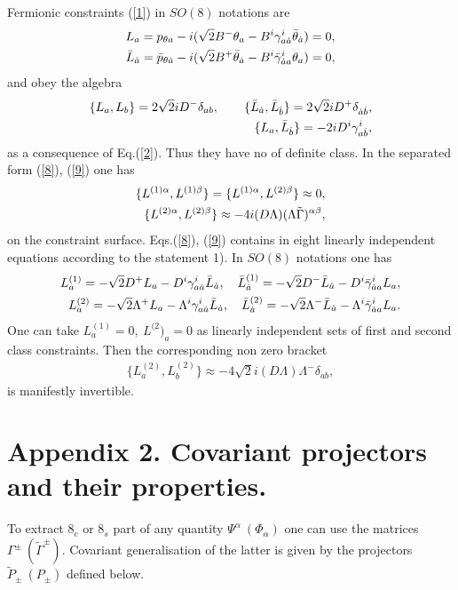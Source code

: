 \documentclass[a4paper]{article}
\begin{document}
Fermionic constraints (\ref{1})  in $SO(8)$ notations are 
\begin{eqnarray}
L_a=p_{\theta a}-i(\sqrt 2B^-\theta_a-
B^i\gamma^i_{a\dot a}\bar\theta_{\dot a})=0, \cr 
\bar L_{\dot a}=\bar p_{\theta\dot a}-i(\sqrt 2B^+\bar\theta_{\dot a}-
B^i\bar\gamma^i_{\dot aa}\theta_a)=0,
\end{eqnarray}
and obey the algebra
\begin{eqnarray}
\{L_a, L_b\}=2\sqrt 2iD^-\delta_{ab}, \qquad 
\{\bar L_{\dot a}, \bar L_{\dot b}\}=
2\sqrt 2iD^+\delta_{\dot a\dot b}, \cr
\{L_a, \bar L_{\dot b}\}=-2iD^i\gamma^i_{a\dot b},
\end{eqnarray}
as a consequence of Eq.(\ref{2}). Thus they have no of definite class. 
In the separated form (\ref{8}), (\ref{9}) one has 
\begin{eqnarray}
\{L^{(1)\alpha}, L^{(1)\beta}\}=
\{L^{(1)\alpha}, L^{(2)\beta}\}\approx 0, \cr
\{L^{(2)\alpha}, L^{(2)\beta}\}\approx
-4i(D\Lambda)(\Lambda\tilde\Gamma)^{\alpha\beta},
\end{eqnarray}
on the constraint surface. Eqs.(\ref{8}), (\ref{9}) contains in eight 
linearly independent equations according to the statement 1). In 
$SO(8)$ notations one has
\begin{eqnarray}
L^{(1)}_a=-\sqrt 2D^+L_a-D^i\gamma^i_{a\dot a}\bar L_{\dot a}, \quad 
\bar L^{(1)}_{\dot a}=-\sqrt 2D^-\bar L_{\dot a}-
D^i\bar\gamma^i_{\dot aa}L_a, \cr 
L^{(2)}_a=-\sqrt 2\Lambda^+L_a-
\Lambda^i\gamma^i_{a\dot a}\bar L_{\dot a}, \quad
\bar L^{(2)}_{\dot a}=-\sqrt 2\Lambda^-\bar L_{\dot a}-
\Lambda^i\bar\gamma^i_{\dot aa}L_a.
\end{eqnarray}
One can take $L^{(1)}_a=0, ~ L^{(2})_a=0$ as linearly independent sets of 
first and second class constraints. Then the corresponding non zero 
bracket
\begin{eqnarray}
\{L^{(2)}_a, L^{(2)}_b\}\approx 
-4\sqrt 2i(D\Lambda)\Lambda^-\delta_{ab},
\end{eqnarray}
is manifestly invertible.

\section*{Appendix 2. Covariant projectors and their properties.}
\setcounter{equation}{8}
\def\theequation{A.\arabic{equation}}
To extract $8_c$ or $8_s$ part of any quantity 
$\Psi^\alpha ~ (\Phi_\alpha)$ one can use the matrices 
$\Gamma^{\pm} ~ (\tilde\Gamma^{\pm})$. Covariant generalisation of the 
latter is given by the projectors $\tilde P_{\pm} ~ (P_{\pm})$ defined 
below.
\end{document}

